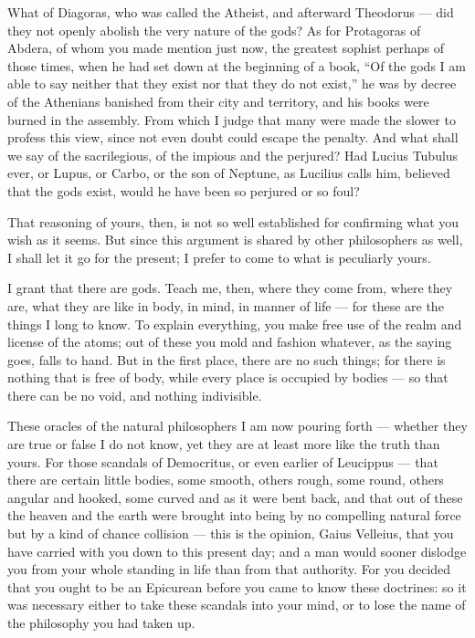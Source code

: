  What of Diagoras, who was called the Atheist, and afterward Theodorus — did they not openly abolish the very nature of the gods? As for Protagoras of Abdera, of whom you made mention just now, the greatest sophist perhaps of those times, when he had set down at the beginning of a book, ``Of the gods I am able to say neither that they exist nor that they do not exist,'' he was by decree of the Athenians banished from their city and territory, and his books were burned in the assembly. From which I judge that many were made the slower to profess this view, since not even doubt could escape the penalty. And what shall we say of the sacrilegious, of the impious and the perjured? Had Lucius Tubulus ever, or Lupus, or Carbo, or the son of Neptune, as Lucilius calls him, believed that the gods exist, would he have been so perjured or so foul?

 That reasoning of yours, then, is not so well established for confirming what you wish as it seems. But since this argument is shared by other philosophers as well, I shall let it go for the present; I prefer to come to what is peculiarly yours.

 I grant that there are gods. Teach me, then, where they come from, where they are, what they are like in body, in mind, in manner of life — for these are the things I long to know. To explain everything, you make free use of the realm and license of the atoms; out of these you mold and fashion whatever, as the saying goes, falls to hand. But in the first place, there are no such things; for there is nothing that is free of body, while every place is occupied by bodies — so that there can be no void, and nothing indivisible.

 These oracles of the natural philosophers I am now pouring forth — whether they are true or false I do not know, yet they are at least more like the truth than yours. For those scandals of Democritus, or even earlier of Leucippus — that there are certain little bodies, some smooth, others rough, some round, others angular and hooked, some curved and as it were bent back, and that out of these the heaven and the earth were brought into being by no compelling natural force but by a kind of chance collision — this is the opinion, Gaius Velleius, that you have carried with you down to this present day; and a man would sooner dislodge you from your whole standing in life than from that authority. For you decided that you ought to be an Epicurean before you came to know these doctrines: so it was necessary either to take these scandals into your mind, or to lose the name of the philosophy you had taken up.

